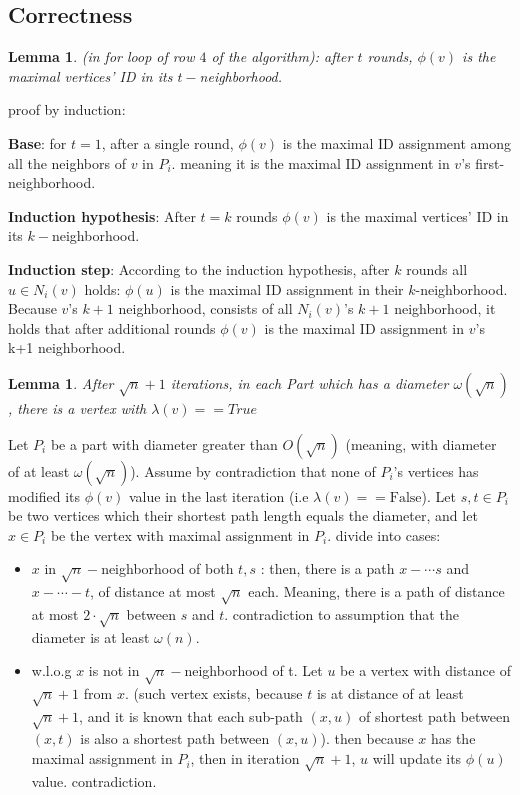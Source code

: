 \documentclass[11pt]{article}
\newtheorem{lemma}[theorem]{Lemma}
\begin{document}
\subsection*{Correctness}

\begin{lemma}
\label{t_neighborhood}
(in for loop of row $4$ of the algorithm): after $t$ rounds, $\phi(v)$ is the maximal vertices' ID in its $t-$neighborhood.
\end{lemma}
proof by induction: 

\textbf{Base}: for $t=1$, after a single round, $\phi(v)$ is the maximal ID assignment among all the neighbors of $v$ in $P_i$. meaning it is the maximal ID assignment in $v$'s first-neighborhood.

\textbf{Induction hypothesis}: After $t=k$ rounds $\phi(v)$ is the maximal vertices' ID in its $k-$neighborhood.

\textbf{Induction step}: According to the induction hypothesis, after $k$ rounds all $u \in N_i(v)$ holds: $\phi(u)$ is the maximal ID assignment in their $k$-neighborhood. Because $v$'s $k+1$ neighborhood, consists of all $N_i(v)$'s $k+1$ neighborhood, it holds that after additional rounds $\phi(v)$ is the maximal ID assignment in $v$'s k+1 neighborhood.

\begin{lemma}
\label{discovery_large_diameter_parts}
After $\sqrt{n} + 1$ iterations, in each Part which has a diameter $\omega(\sqrt{n})$, there is a vertex with $\lambda(v) == True$
\end{lemma}
Let $P_i$ be a part with diameter greater than $O(\sqrt{n})$ (meaning, with diameter of at least $\omega(\sqrt{n})$). Assume by contradiction that none of $P_i$'s vertices has modified its $\phi(v)$ value in the last iteration (i.e $\lambda(v) == \text{False}$). Let $s,t \in P_i$ be two vertices which their shortest path length equals the diameter, and let $x \in P_i$ be the vertex with maximal assignment in $P_i$. divide into cases:
\begin{itemize}
    \item $x$ in $\sqrt{n}-$neighborhood of both $t,s$ : then, there is a path $x - \cdots s$ and $x - \cdots - t$, of distance at most $\sqrt{n}$ each. Meaning, there is a path of distance at most $2 \cdot \sqrt{n}$ between $s$ and $t$. contradiction to assumption that the diameter is at least $\omega(n)$.
    \item w.l.o.g $x$ is not in $\sqrt{n}-$neighborhood of t. Let $u$ be a vertex with distance of $\sqrt{n} +1 $ from $x$. (such vertex exists, because $t$ is at distance of at least $\sqrt{n} +1 $, and it is known that each sub-path $(x,u)$ of shortest path between $(x,t)$ is also a shortest path between $(x,u)$). then because $x$ has the maximal assignment in $P_i$, then in iteration $\sqrt{n} +1$, $u$ will update its $\phi(u)$ value. contradiction.
\end{itemize}
\end{document}
